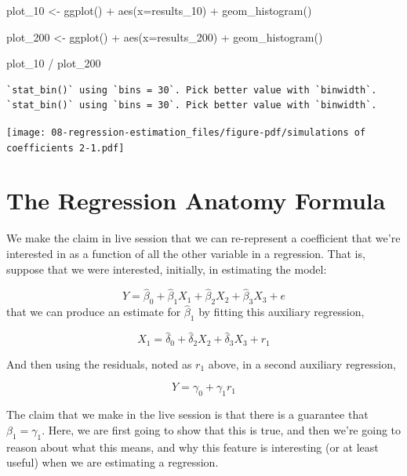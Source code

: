 \documentclass[
  letterpaper,
  DIV=11,
  numbers=noendperiod]{scrreprt}
\newenvironment{Shaded}{\begin{snugshade}}{\end{snugshade}}
\newcommand{\AttributeTok}[1]{\textcolor[rgb]{0.40,0.45,0.13}{#1}}
\newcommand{\FunctionTok}[1]{\textcolor[rgb]{0.28,0.35,0.67}{#1}}
\newcommand{\NormalTok}[1]{\textcolor[rgb]{0.00,0.23,0.31}{#1}}
\newcommand{\OtherTok}[1]{\textcolor[rgb]{0.00,0.23,0.31}{#1}}
\newcommand{\SpecialCharTok}[1]{\textcolor[rgb]{0.37,0.37,0.37}{#1}}
\begin{document}
\begin{Shaded}
\begin{Highlighting}[]
\NormalTok{plot\_10 }\OtherTok{\textless{}{-}} \FunctionTok{ggplot}\NormalTok{() }\SpecialCharTok{+} 
  \FunctionTok{aes}\NormalTok{(}\AttributeTok{x=}\NormalTok{results\_10) }\SpecialCharTok{+} 
  \FunctionTok{geom\_histogram}\NormalTok{()}

\NormalTok{plot\_200 }\OtherTok{\textless{}{-}} \FunctionTok{ggplot}\NormalTok{() }\SpecialCharTok{+} 
  \FunctionTok{aes}\NormalTok{(}\AttributeTok{x=}\NormalTok{results\_200) }\SpecialCharTok{+} 
  \FunctionTok{geom\_histogram}\NormalTok{()}
  
\NormalTok{plot\_10 }\SpecialCharTok{/} 
\NormalTok{  plot\_200}
\end{Highlighting}
\end{Shaded}

\begin{verbatim}
`stat_bin()` using `bins = 30`. Pick better value with `binwidth`.
`stat_bin()` using `bins = 30`. Pick better value with `binwidth`.
\end{verbatim}

\texttt{[image: 08-regression-estimation\_files/figure-pdf/simulations of coefficients 2-1.pdf]}

\section{The Regression Anatomy
Formula}\label{the-regression-anatomy-formula}

We make the claim in live session that we can re-represent a coefficient
that we're interested in as a function of all the other variable in a
regression. That is, suppose that we were interested, initially, in
estimating the model:

\[ 
Y = \hat\beta_{0} + \hat\beta_{1} X_{1} + \hat\beta_{2} X_{2} + \hat\beta_{3}X_{3} + e
\] that we can produce an estimate for \(\hat\beta_{1}\) by fitting this
auxiliary regression,

\[
X_{1} = \hat\delta_{0} + \hat\delta_2X_2 + \hat\delta_3X_3 + r_{1}
\]

And then using the residuals, noted as \(r_1\) above, in a second
auxiliary regression,

\[ 
Y = \gamma_0 + \gamma_1 r_1
\]

The claim that we make in the live session is that there is a guarantee
that \(\beta_1 = \gamma_1\). Here, we are first going to show that this
is true, and then we're going to reason about what this means, and why
this feature is interesting (or at least useful) when we are estimating
a regression.
\end{document}
